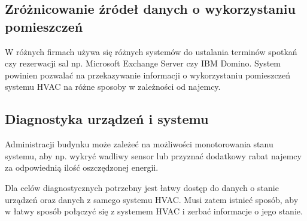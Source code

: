 \subsection*{Zróżnicowanie źródeł danych o wykorzystaniu pomieszczeń}
W różnych firmach używa się różnych systemów do ustalania terminów spotkań czy rezerwacji sal np. Microsoft Exchange Server czy IBM Domino.
System powinien pozwalać na przekazywanie informacji o wykorzystaniu pomieszczeń systemu HVAC na różne sposoby w zależności od najemcy.

\subsection*{Diagnostyka urządzeń i systemu}
Administracji budynku może zależeć na możliwości monotorowania stanu systemu, aby np. wykryć wadliwy sensor lub przyznać dodatkowy rabat najemcy za odpowiednią ilość oszczędzonej energii.

Dla celów diagnostycznych potrzebny jest łatwy dostęp do danych o stanie urządzeń oraz danych z samego systemu HVAC. Musi zatem istnieć sposób, aby w łatwy sposób połączyć się z systemem HVAC i zerbać informacje o jego stanie.
